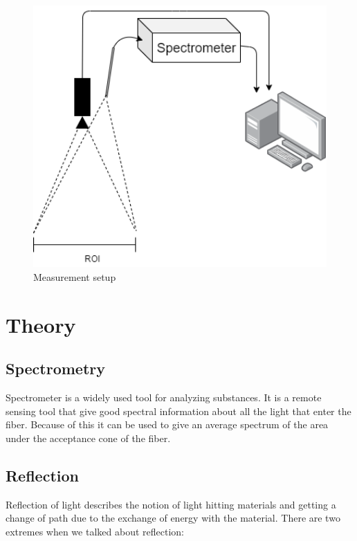 \documentclass{article}
\begin{document}
\begin{figure}[hb]
    \centering
    \includegraphics[width=1\textwidth]{figures/pt_setup.png}
    \caption{Measurement setup}
    \label{fig:measurement_setup}
\end{figure}


\section{Theory}

\subsection{Spectrometry }
Spectrometer is a widely used tool for analyzing substances. It is a remote sensing tool that give good spectral information about all the light that enter the fiber. Because of this it can be used to give an average spectrum of the area under the acceptance cone of the fiber. 

\subsection{Reflection}
Reflection of light describes the notion of light hitting materials and getting a change of path due to the exchange of energy with the material. There are two extremes when we talked about reflection:
\end{document}

